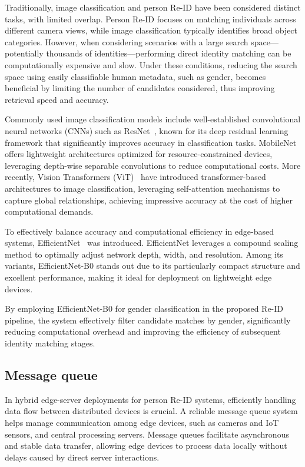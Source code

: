 \documentclass[../main.tex]{subfiles}
\begin{document}
Traditionally, image classification and person Re-ID have been considered distinct tasks, with limited overlap. Person Re-ID focuses on matching individuals across different camera views, while image classification typically identifies broad object categories. However, when considering scenarios with a large search space—potentially thousands of identities—performing direct identity matching can be computationally expensive and slow. Under these conditions, reducing the search space using easily classifiable human metadata, such as gender, becomes beneficial by limiting the number of candidates considered, thus improving retrieval speed and accuracy.

Commonly used image classification models include well-established convolutional neural networks (CNNs) such as ResNet~\cite{he2015deepresiduallearningimage}, known for its deep residual learning framework that significantly improves accuracy in classification tasks. MobileNet~\cite{mobilenet} offers lightweight architectures optimized for resource-constrained devices, leveraging depth-wise separable convolutions to reduce computational costs. More recently, Vision Transformers (ViT)~\cite{ViT} have introduced transformer-based architectures to image classification, leveraging self-attention mechanisms to capture global relationships, achieving impressive accuracy at the cost of higher computational demands.

To effectively balance accuracy and computational efficiency in edge-based systems, EfficientNet~\cite{efficientnet} was introduced. EfficientNet leverages a compound scaling method to optimally adjust network depth, width, and resolution. Among its variants, EfficientNet-B0 stands out due to its particularly compact structure and excellent performance, making it ideal for deployment on lightweight edge devices. 

By employing EfficientNet-B0 for gender classification in the proposed Re-ID pipeline, the system effectively filter candidate matches by gender, significantly reducing computational overhead and improving the efficiency of subsequent identity matching stages.


\subsection{Message queue}
\label{sec:message_queue}

In hybrid edge-server deployments for person Re-ID systems, efficiently handling data flow between distributed devices is crucial. A reliable message queue system helps manage communication among edge devices, such as cameras and IoT sensors, and central processing servers. Message queues facilitate asynchronous and stable data transfer, allowing edge devices to process data locally without delays caused by direct server interactions.
\end{document}
